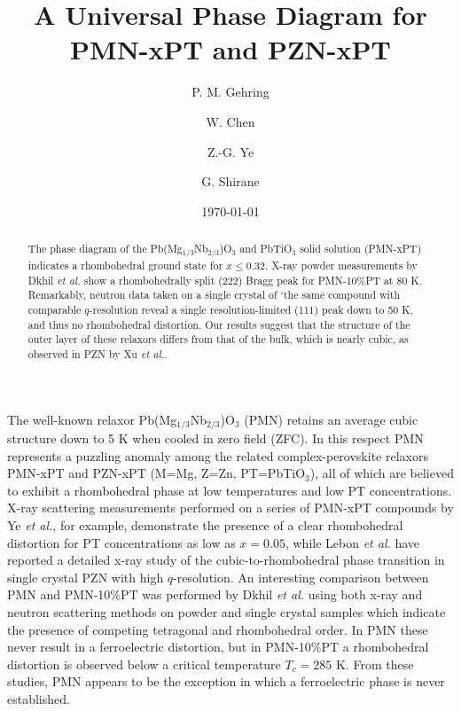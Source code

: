 \importpackages{}
\graphicspath{ {./images/} }


\title{A Universal Phase Diagram for PMN-xPT and PZN-xPT}
\author{P. M. Gehring}
\author{W. Chen}
\author{Z.-G. Ye}
\author{G. Shirane}
\date{\today}
\begin{abstract}
The phase diagram of the Pb(Mg$_{1/3}$Nb$_{2/3}$)O$_3$ and PbTiO$_3$ solid solution (PMN-xPT) indicates a rhombohedral ground state for $x\leq 0.32$. X-ray powder measurements by Dkhil {\it et al.} show a rhombohedrally split (222) Bragg peak for PMN-10\%PT at 80 K. Remarkably, neutron data taken on a single crystal of `the same compound with comparable $q$-resolution reveal a single resolution-limited (111) peak down to 50 K, and thus no rhombohedral distortion. Our results suggest that the structure of the outer layer of these relaxors differs from that of the bulk, which is nearly cubic, as observed in PZN by Xu {\it et al.}.
\end{abstract}
\maketitle
The well-known relaxor Pb(Mg$_{1/3}$Nb$_{2/3}$)O$_3$ (PMN)
retains an average cubic structure down to 5 K when cooled in zero field (ZFC). \cite{1,2,3} In this respect PMN represents a puzzling anomaly among the related complex-perovskite relaxors PMN-xPT and PZN-xPT (M=Mg, Z=Zn, PT=PbTiO$_3$), all of which are believed to exhibit a rhombohedral phase at low temperatures and low PT concentrations. \cite{4,5,6,7} X-ray scattering measurements performed on a series of PMN-xPT compounds by Ye {\it et al.}, for example, demonstrate the presence of a clear rhombohedral distortion for PT concentrations as low as $x=0.05$, \cite{8} while Lebon {\it et al.} have reported a detailed x-ray study of the cubic-to-rhombohedral phase transition in single crystal PZN with high $q$-resolution. \cite{9} An interesting comparison between PMN and PMN-10\%PT was performed by Dkhil {\it et al.} using both x-ray and neutron scattering methods on powder and single crystal samples which indicate the presence of competing tetragonal and rhombohedral order. \cite{10} In PMN these never result in a ferroelectric distortion, but in PMN-10\%PT a rhombohedral distortion is observed below a critical temperature $T_c=285$ K. From these studies, PMN appears to be the exception in which a ferroelectric phase is never established.
